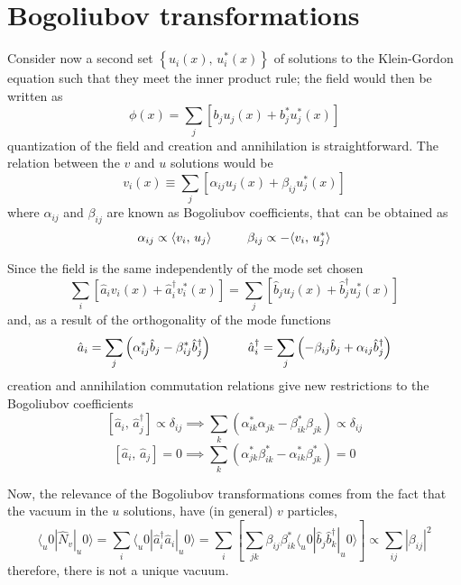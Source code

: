 \section{Bogoliubov transformations}
Consider now a second set $\left\{u_i(x),\,u_i^*(x)\right\}$ of solutions to the Klein-Gordon equation such that they meet the inner product rule; the field would then be written as
\begin{equation}
	\phi(x)=\sum_j\left[b_ju_j(x)+b_j^*u_j^*(x)\right]
\end{equation}
quantization of the field and creation and annihilation is straightforward. The relation between the $v$ and $u$ solutions would be
\begin{equation}
	v_i(x)\equiv\sum_j\left[\alpha_{ij}u_j(x)+\beta_{ij}u^*_j(x)\right]
\end{equation}
where $\alpha_{ij}$ and $\beta_{ij}$ are known as Bogoliubov coefficients, that can be obtained as
\begin{equation}
	\alpha_{ij}\propto\langle v_i,\,u_j\rangle\hspace{1.0cm}\beta_{ij}\propto -\langle v_i,\,u_j^*\rangle
\end{equation}

Since the field is the same independently of the mode set chosen
\begin{equation}
	\sum_i\left[\hat{a}_iv_i(x)+\hat{a}_i^\dagger v^*_i(x)\right]=\sum_j\left[\hat{b}_ju_j(x)+\hat{b}_j^\dagger u_j^*(x)\right]
\end{equation}
and, as a result of the orthogonality of the mode functions
\begin{equation}
	\hat{a}_i=\sum_j\left(\alpha_{ij}^*\hat{b}_j-\beta_{ij}^*\hat{b}_j^\dagger\right)\hspace{1.0cm}\hat{a}_i^\dagger=\sum_j\left(-\beta_{ij}\hat{b}_j+\alpha_{ij}\hat{b}_j^\dagger\right)
\end{equation}
creation and annihilation commutation relations give new restrictions to the Bogoliubov coefficients
\begin{equation}
	\left[\hat{a}_i,\,\hat{a}_j^\dagger\right]\propto\delta_{ij}\implies \sum_k\left(\alpha_{ik}^*\alpha_{jk}-\beta^*_{ik}\beta_{jk}\right)\propto\delta_{ij}
\end{equation}
\begin{equation}
	\left[\hat{a}_i,\,\hat{a}_j\right]=0\implies \sum_k\left(\alpha_{jk}^*\beta_{ik}^*-\alpha_{ik}^*\beta_{jk}^*\right)=0
\end{equation}

Now, the relevance of the Bogoliubov transformations comes from the fact that the vacuum in the $u$ solutions, have (in general) $v$ particles,
\begin{equation}
	\langle_u0|\hat{N}_v|_u0\rangle=\sum_i\langle_u0|\hat{a}_i^\dagger\hat{a}_i|_u0\rangle=\sum_{i}\left[\sum_{jk}\beta_{ij}\beta^*_{ik}\langle_u0|\hat{b}_j\hat{b}_k^\dagger|_u0\rangle\right]\propto \sum_{ij}|\beta_{ij}|^2
\end{equation}
therefore, there is not a unique vacuum.

